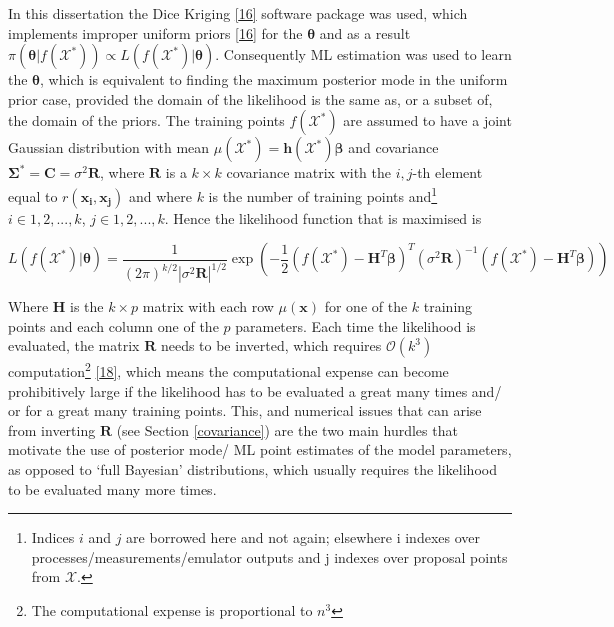 \documentclass[
  12pt,
  a4paper,
  twoside]{book}
\begin{document}
In this dissertation the Dice Kriging \protect\hyperlink{ref-dicekriging}{{[}16{]}} software package was used, which implements improper uniform priors \protect\hyperlink{ref-dicekriging}{{[}16{]}} for the \(\mathbf{\theta}\) and as a result \(\pi(\mathbf{\theta}|f(\mathcal{X^*})) \propto L(f(\mathcal{X^*})| \mathbf{\theta})\). Consequently ML estimation was used to learn the \(\mathbf{\theta}\), which is equivalent to finding the maximum posterior mode in the uniform prior case, provided the domain of the likelihood is the same as, or a subset of, the domain of the priors. The training points \(f(\mathcal{X^*})\) are assumed to have a joint Gaussian distribution with mean \(\mu(\mathcal{X^*})=\mathbf{h(\mathcal{X^*})\mathbf{\beta}}\) and covariance \(\mathbf{\Sigma^*}=\mathbf{C} = \sigma^2 \mathbf{R}\), where \(\mathbf{R}\) is a \(k \times k\) covariance matrix with the \(i,j\)-th element equal to \(r(\mathbf{x_i}, \mathbf{x_j})\) and where \(k\) is the number of training points and\footnote{Indices \(i\) and \(j\) are borrowed here and not again; elsewhere i indexes over processes/measurements/emulator outputs and j indexes over proposal points from \(\mathcal{X}\).} \(i \in 1,2,...,k\), \(j \in 1,2,...,k\). Hence the likelihood function that is maximised is

\begin{equation}
\label{eq:likelihood}
L(f(\mathcal{X^*})| \mathbf{\theta}) = \frac{1}{(2\pi)^{k/2} |\sigma^2 \mathbf{R}|^{1/2}} \exp \left( - \frac{1}{2} \left( f(\mathcal{X^*}) - \mathbf{H}^T\mathbf{\beta}\right)^T \left(\sigma^2 \mathbf{R} \right)^{-1} \left( f(\mathcal{X^*}) - \mathbf{H}^T\mathbf{\beta}\right) \right)
\end{equation}

Where \(\mathbf{H}\) is the \(k \times p\) matrix with each row \(\mu(\mathbf{\mathbf{x}})\) for one of the \(k\) training points and each column one of the \(p\) parameters. Each time the likelihood is evaluated, the matrix \(\mathbf{R}\) needs to be inverted, which requires \(\mathcal{O}(k^3)\) computation\footnote{The computational expense is proportional to \(n^3\)} \protect\hyperlink{ref-gelman2013bayesian}{{[}18{]}}, which means the computational expense can become prohibitively large if the likelihood has to be evaluated a great many times and/ or for a great many training points. This, and numerical issues that can arise from inverting \(\mathbf{R}\) (see Section \ref{covariance}) are the two main hurdles that motivate the use of posterior mode/ ML point estimates of the model parameters, as opposed to `full Bayesian' distributions, which usually requires the likelihood to be evaluated many more times.
\end{document}
